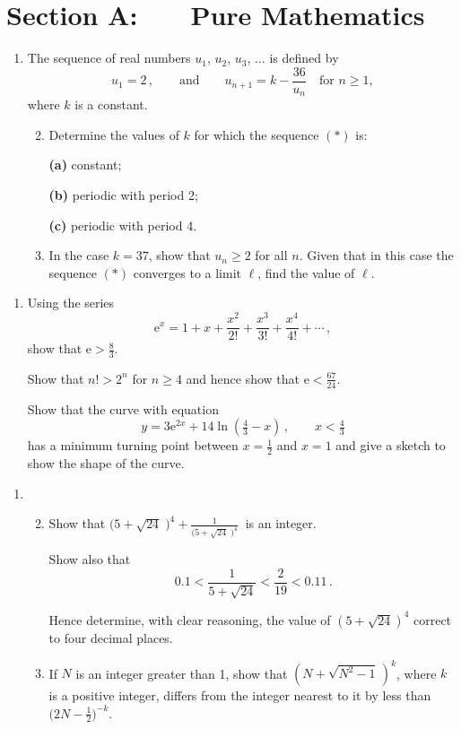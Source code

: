 \documentclass[a4, 11pt]{report}
\newlength{\qspace}
\newcounter{qnumber}
\newenvironment{question}%
 {\vspace{\qspace}
  \begin{enumerate}[\bfseries 1\quad][10]%
    \setcounter{enumi}{\value{qnumber}}%
    \item%
 }
{
  \end{enumerate}
  \filbreak
  \stepcounter{qnumber}
 }
\newenvironment{questionparts}[1][1]%
 {
  \begin{enumerate}[\bfseries (i)]%
    \setcounter{enumii}{#1}
    \addtocounter{enumii}{-1}
    \setlength{\itemsep}{5mm}
    \setlength{\parskip}{8pt}
 }
 {
  \end{enumerate}
 }
\def\e{{\mathrm e}}
\def\ge{\geqslant}
\def\l{\left(}
\def\r{\right)}
\begin{document}
\setcounter{page}{2}

 
\section*{Section A: \ \ \ Pure Mathematics}

\begin{question}
The sequence of real numbers $u_1$, $u_2$, $u_3$, $\ldots$ is defined by
\begin{equation*}
u_1=2 \,,
\qquad\text{and} \qquad  u_{n+1} = k - \frac{36}{u_n} 
\quad \text{for } n\ge1,
\tag{$*$}
\end{equation*}
where $k$ is a constant.

\begin{questionparts}
\item Determine the values of $k$ for which the sequence $(*)$ is:

\textbf{(a)} constant;

\textbf{(b)} periodic with period 2;

\textbf{(c)} periodic with period 4.

\item
In the case $k=37$, show that $u_n\ge 2$ for all $n$. Given that  in this
case the sequence $(*)$ converges to a limit
$\ell$, find the value of $\ell$.

\end{questionparts}
\end{question}

\begin{question}
Using the series
\[
\e^x = 1 + x +\frac{x^2}{2!} + \frac{x^3}{3!} + \frac{x^4}{4!}+\cdots\,,
\]
show that $\e>\frac83$. 

Show that   $n!>2^n$ for $n\ge4$ and hence show that
$\e<\frac {67}{24}$.


Show that the curve with equation 
\[
y= 3\e^{2x} +14 \ln (\tfrac43-x)\,,
\qquad
{x<\tfrac43}
\]
has a minimum turning point between $x=\frac12$ and $x=1$ and 
give a  sketch to show the shape of the curve.
\end{question}

\begin{question}
\begin{questionparts}
\item Show that 
$\displaystyle \big( 5 + \sqrt {24}\;\big)^4 
+ \frac{1 }{\big(5 + \sqrt {24}\;\big)^4} \ $ is an integer.

Show also 
that 
\[\displaystyle 0.1 < \frac{1}{  5 + \sqrt {24}} <\frac 2 {19}< 0.11\,.\] 

Hence determine, with clear reasoning, 
the value of $\l 5 + \sqrt {24}\r^4$ correct to four decimal places.

\item If $N$ is an integer greater than 1, 
show that  $( N + \sqrt {N^2 - 1} \,) ^k$, where $k$ is a positive
integer,  differs from 
the integer nearest to it by less than $\big( 2N - \frac12 \big)^{-k}$.
\end{questionparts}
\end{question}
\end{document}

